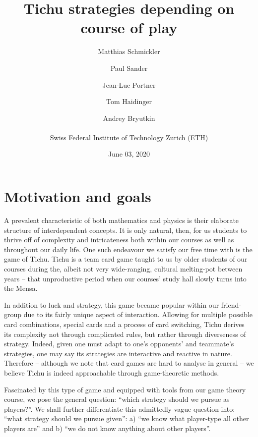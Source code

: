 


\usepackage{multirow}
\usepackage{listings}
\usepackage{commath}


\title{Tichu strategies depending on course of play}
\date{June 03, 2020}
\author{Matthias Schmickler \and Paul Sander \and Jean-Luc Portner \and Tom Haidinger \and Andrey Bryutkin \\ \\ Swiss Federal Institute of Technology Zurich (ETH)}
\maketitle

\section{Motivation and goals}

A prevalent characteristic of both mathematics and physics is their elaborate structure of interdependent concepts. It is only natural, then, for us students to thrive off of complexity and intricateness both within our courses as well as throughout our daily life. One such endeavour we satisfy our free time with is the game of Tichu. Tichu is a team card game taught to us by older students of our courses during the, albeit not very wide-ranging, cultural melting-pot between years – that unproductive period when our courses’ study hall slowly turns into the Mensa. 

    In addition to luck and strategy, this game became popular within our friend-group due to its fairly unique aspect of interaction. Allowing for multiple possible card combinations, special cards and a process of card switching, Tichu derives its complexity not through complicated rules, but rather through diverseness of strategy. Indeed, given one must adapt to one’s opponents’ and teammate’s strategies, one may say its strategies are interactive and reactive in nature. Therefore – although we note that card games are hard to analyse in general – we believe Tichu is indeed approachable through game-theoretic methods. 

    Fascinated by this type of game and equipped with tools from our game theory course, we pose the general question: “which strategy should we pursue as players?”. We shall further differentiate this admittedly vague question into: “what strategy should we pursue given”: a) “we know what player-type all other players are” and b) “we do not know anything about other players”. 
